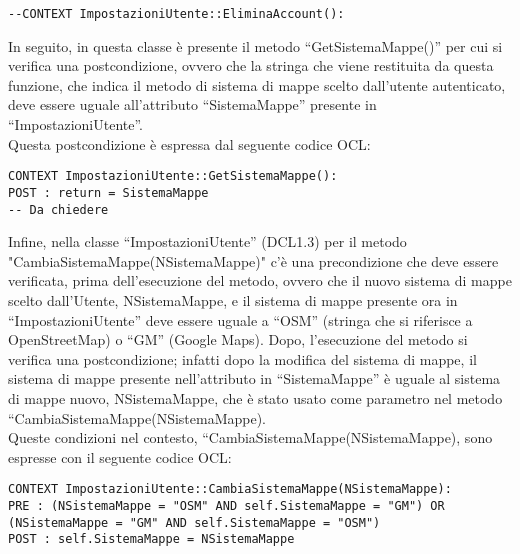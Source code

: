 \begin{listaPersonale}[OCL]{}
\begin{lstlisting}
--CONTEXT ImpostazioniUtente::EliminaAccount():
    \end{lstlisting}
    In seguito, in questa classe è presente il metodo “GetSistemaMappe()” per cui si verifica una postcondizione, ovvero che la stringa che viene restituita da questa funzione, che indica il metodo di sistema di mappe scelto dall’utente autenticato, deve essere uguale all’attributo “SistemaMappe” presente in “ImpostazioniUtente”. \\ Questa postcondizione è espressa dal seguente codice OCL:
    \begin{lstlisting}
CONTEXT ImpostazioniUtente::GetSistemaMappe():
POST : return = SistemaMappe 
-- Da chiedere
    \end{lstlisting}
    Infine, nella classe “ImpostazioniUtente” (DCL1.3) per il metodo \\ "CambiaSistemaMappe(NSistemaMappe)" c’è una precondizione che deve essere verificata, prima dell’esecuzione del metodo, ovvero che il nuovo sistema di mappe scelto dall’Utente, NSistemaMappe, e il sistema di mappe presente ora in “ImpostazioniUtente” deve essere uguale a “OSM” (stringa che si riferisce a OpenStreetMap) o “GM” (Google Maps).
    Dopo, l’esecuzione del metodo si verifica una postcondizione; infatti dopo la modifica del sistema di mappe, il sistema di mappe presente nell’attributo in “SistemaMappe” è uguale al sistema di mappe nuovo, NSistemaMappe, che è stato usato come parametro nel metodo “CambiaSistemaMappe(NSistemaMappe).\\
    Queste condizioni nel contesto, “CambiaSistemaMappe(NSistemaMappe), sono espresse con il seguente codice OCL:

    \begin{lstlisting}
CONTEXT ImpostazioniUtente::CambiaSistemaMappe(NSistemaMappe):
PRE : (NSistemaMappe = "OSM" AND self.SistemaMappe = "GM") OR (NSistemaMappe = "GM" AND self.SistemaMappe = "OSM")
POST : self.SistemaMappe = NSistemaMappe
    \end{lstlisting}





\end{listaPersonale}
